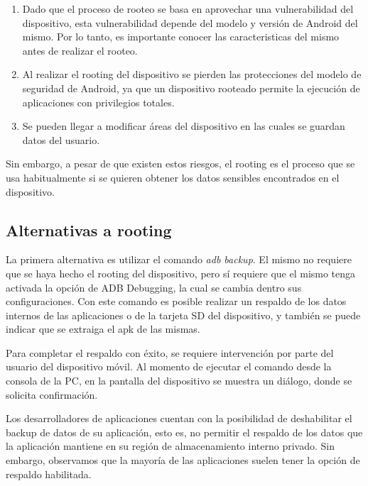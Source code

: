 \begin{enumerate}
\item Dado que el proceso de rooteo se basa en aprovechar una vulnerabilidad del dispositivo, esta vulnerabilidad depende del modelo y versión de Android del mismo. Por lo tanto, es importante conocer las caracteristicas del mismo antes de realizar el rooteo.
\item Al realizar el rooting del dispositivo se pierden las protecciones del modelo de seguridad de Android, ya que un dispositivo rooteado permite la ejecución de aplicaciones con privilegios totales.
\item Se pueden llegar a modificar áreas del dispositivo en las cuales se guardan datos del usuario.
\end{enumerate}

Sin embargo, a pesar de que existen estos riesgos, el rooting es el proceso que se usa habitualmente si se quieren obtener los datos sensibles encontrados en el dispositivo.

\subsection{Alternativas a rooting}
\label{alternativasRooting}

La primera alternativa es utilizar el comando \emph{adb backup}. El mismo no requiere que se haya hecho el rooting del dispositivo, pero sí requiere que el mismo tenga activada la opción de ADB Debugging, la cual se cambia dentro sus configuraciones. Con este comando es posible realizar un respaldo de los datos internos de las aplicaciones o de la tarjeta SD del dispositivo, y también se puede indicar que se extraiga el apk de las mismas.

Para completar el respaldo con éxito, se requiere intervención por parte del usuario del dispositivo móvil. Al momento de ejecutar el comando desde la consola de la PC, en la pantalla del dispositivo se muestra un diálogo, donde se solicita confirmación.

Los desarrolladores de aplicaciones cuentan con la posibilidad de deshabilitar el backup de datos de su aplicación, esto es, no permitir el respaldo de los datos que la aplicación mantiene en su región de almacenamiento interno privado. Sin embargo, observamos que la mayoría de las aplicaciones suelen tener la opción de respaldo habilitada.

